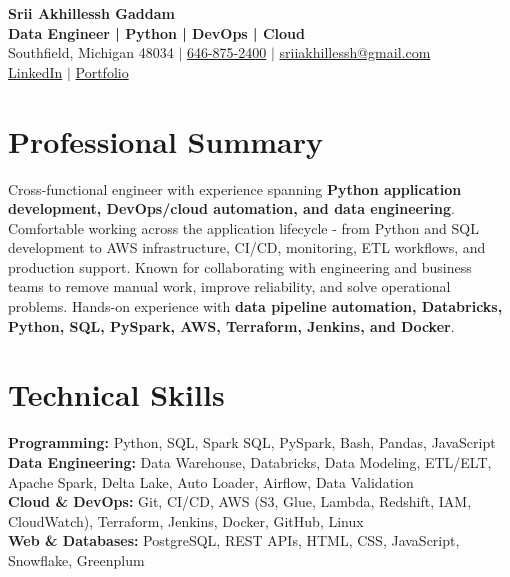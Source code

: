 \documentclass[letterpaper,10pt]{article}
\begin{document}
\fontsize{9.35pt}{10.45pt}\selectfont

\begin{center}
    {\LARGE \textbf{Srii Akhillessh Gaddam}} \\[-1pt]
    \textbf{Data Engineer | Python | DevOps | Cloud} \\[2pt]
    Southfield, Michigan 48034 $|$
    \href{tel:6468752400}{646-875-2400} $|$
    \href{mailto:sriiakhillessh@gmail.com}{sriiakhillessh@gmail.com} \\[1pt]
    \href{https://www.linkedin.com/in/srii-akhiilessh-gaddam-b48668191/}{LinkedIn} $|$
    \href{https://sriiakhillesshg.github.io/portfolio/}{Portfolio}
\end{center}
\vspace{-8pt}

\section{Professional Summary}
\small{Cross-functional engineer with experience spanning \textbf{Python application development, DevOps/cloud automation, and data engineering}. Comfortable working across the application lifecycle - from Python and SQL development to AWS infrastructure, CI/CD, monitoring, ETL workflows, and production support. Known for collaborating with engineering and business teams to remove manual work, improve reliability, and solve operational problems. Hands-on experience with \textbf{data pipeline automation, Databricks, Python, SQL, PySpark, AWS, Terraform, Jenkins, and Docker}.}

\section{Technical Skills}
\small{
\textbf{Programming:} Python, SQL, Spark SQL, PySpark, Bash, Pandas, JavaScript \\
\textbf{Data Engineering:} Data Warehouse, Databricks, Data Modeling, ETL/ELT, Apache Spark, Delta Lake, Auto Loader, Airflow, Data Validation \\
\textbf{Cloud \& DevOps:} Git, CI/CD, AWS (S3, Glue, Lambda, Redshift, IAM, CloudWatch), Terraform, Jenkins, Docker, GitHub, Linux \\
\textbf{Web \& Databases:} PostgreSQL, REST APIs, HTML, CSS, JavaScript, Snowflake, Greenplum
}
\end{document}
